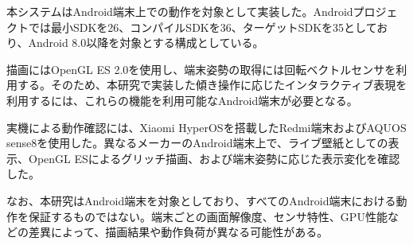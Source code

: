 本システムはAndroid端末上での動作を対象として実装した。Androidプロジェクトでは最小SDKを26、コンパイルSDKを36、ターゲットSDKを35としており、Android 8.0以降を対象とする構成としている。

描画にはOpenGL ES 2.0を使用し、端末姿勢の取得には回転ベクトルセンサを利用する。そのため、本研究で実装した傾き操作に応じたインタラクティブ表現を利用するには、これらの機能を利用可能なAndroid端末が必要となる。

実機による動作確認には、Xiaomi HyperOSを搭載したRedmi端末およびAQUOS sense8を使用した。異なるメーカーのAndroid端末上で、ライブ壁紙としての表示、OpenGL ESによるグリッチ描画、および端末姿勢に応じた表示変化を確認した。

なお、本研究はAndroid端末を対象としており、すべてのAndroid端末における動作を保証するものではない。端末ごとの画面解像度、センサ特性、GPU性能などの差異によって、描画結果や動作負荷が異なる可能性がある。
